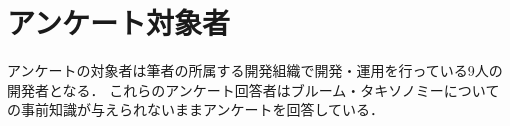 \section{アンケート対象者}
アンケートの対象者は筆者の所属する開発組織で開発・運用を行っている9人の開発者となる．
これらのアンケート回答者はブルーム・タキソノミーについての事前知識が与えられないままアンケートを回答している．
